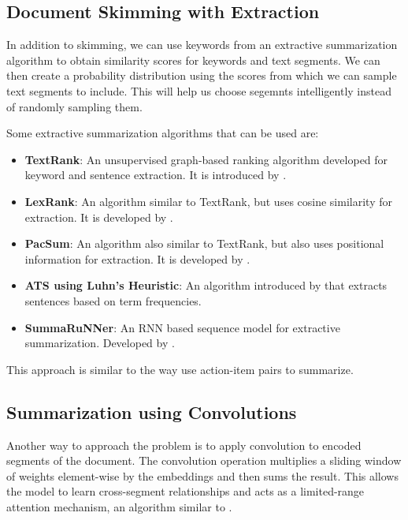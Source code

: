 \subsection{Document Skimming with Extraction}

In addition to skimming, we can use keywords from an extractive summarization
algorithm to obtain similarity scores for keywords and text segments.
We can then create a probability distribution using the scores from which we can sample
text segments to include.
This will help us choose segemnts intelligently instead of randomly sampling them.

Some extractive summarization algorithms that can be used are:

\begin{itemize}
	\item \textbf{TextRank}: An unsupervised graph-based ranking algorithm developed for
	keyword and sentence extraction. It is introduced by
	\citet{mihalcea-tarau-2004-textrank}.
	\item \textbf{LexRank}: An algorithm similar to TextRank, but uses cosine similarity
	for extraction. It is developed by \citet{erkan2004lexrank}.
	\item \textbf{PacSum}: An algorithm also similar to TextRank, but also uses
	positional information for extraction. It is developed by
	\citet{zheng-lapata-2019-sentence}.
	\item \textbf{ATS using Luhn's Heuristic}: An algorithm introduced by
	\citet{10188527} that extracts sentences based on term frequencies.
	\item \textbf{SummaRuNNer}: An RNN based sequence model for extractive summarization.
	Developed by \citet{Nallapati_Zhai_Zhou_2017}.
\end{itemize}

This approach is similar to the way \citet{10.1145/3639233.3639253} use action-item
pairs to summarize.


\subsection{Summarization using Convolutions}

Another way to approach the problem is to apply convolution to encoded segments of
the document.
The convolution operation multiplies a sliding window of weights element-wise by the
embeddings and then sums the result.
This allows the model to learn cross-segment relationships and acts as a
limited-range attention mechanism, an algorithm similar to \citet{chen2022long}.

